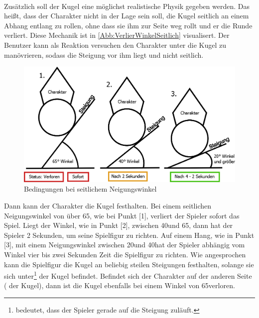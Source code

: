 \paragraph{}
Zusätzlich soll der Kugel eine möglichst realistische Physik gegeben werden. Das heißt, dass der Charakter nicht in der Lage sein soll, die Kugel seitlich an einem Abhang entlang zu rollen, ohne dass sie ihm zur Seite weg rollt und er die Runde verliert. Diese Mechanik ist in \autoref{Abb:VerlierWinkelSeitlich} visualisert. Der Benutzer kann als Reaktion versuchen den Charakter unter die Kugel zu manövrieren, sodass die Steigung vor ihm liegt und nicht seitlich.

\begin{figure}
\begin{center}
\includegraphics[scale=0.17]{Bilder/Diagramme/VerlierWinkelSeitlich.png}
\end{center}
\begin{footnotesize}
\caption{Bedingungen bei seitlichem Neigungswinkel}
\label{Abb:VerlierWinkelSeitlich}
\end{footnotesize}
\end{figure}

Dann kann der Charakter die Kugel festhalten. Bei einem seitlichen Neigungswinkel von über 65\cc, wie bei Punkt [1], verliert der Spieler sofort das Spiel. Liegt der Winkel, wie in Punkt [2], zwischen 40\cc und 65\cc, dann hat der Spieler 2 Sekunden, um seine Spielfigur zu richten. Auf einem Hang, wie in Punkt [3], mit einem Neigungswinkel zwischen 20\cc und 40\cc hat der Spieler abhängig vom Winkel vier bis zwei Sekunden Zeit die Spielfigur zu richten. Wie angesprochen kann die Spielfigur die Kugel an beliebig steilen Steigungen festhalten, solange sie sich unter\footnote{ bedeutet, dass der Spieler gerade auf die Steigung zuläuft.} der Kugel befindet. Befindet sich der Charakter auf der anderen Seite ( der Kugel), dann ist die Kugel ebenfalls bei einem Winkel von 65\cc verloren.
